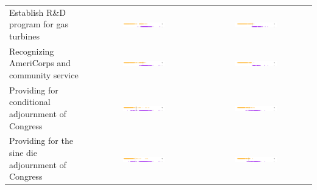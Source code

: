 \begin{table}
\begin{tabular}{|p{4.3cm}|c|c|}
Establish R\&D program for gas turbines 
& \includegraphics[width=0.4\textwidth]{chapter_spatial_voting_with_text/figures/3397_ideal_point_8.pdf}
& \includegraphics[width=0.4\textwidth]{chapter_spatial_voting_with_text/figures/3397_adjusted_ideal_point_8.pdf} \\

Recognizing AmeriCorps and community service
& \includegraphics[width=0.4\textwidth]{chapter_spatial_voting_with_text/figures/3397_ideal_point_7.pdf}
& \includegraphics[width=0.4\textwidth]{chapter_spatial_voting_with_text/figures/3397_adjusted_ideal_point_7.pdf} \\

Providing for conditional adjournment of Congress
& \includegraphics[width=0.4\textwidth]{chapter_spatial_voting_with_text/figures/3397_ideal_point_6.pdf}
& \includegraphics[width=0.4\textwidth]{chapter_spatial_voting_with_text/figures/3397_adjusted_ideal_point_6.pdf} \\

Providing for the sine die adjournment of Congress
& \includegraphics[width=0.4\textwidth]{chapter_spatial_voting_with_text/figures/3397_ideal_point_5.pdf}
& \includegraphics[width=0.4\textwidth]{chapter_spatial_voting_with_text/figures/3397_adjusted_ideal_point_5.pdf} \\


\end{tabular}
\end{table}
